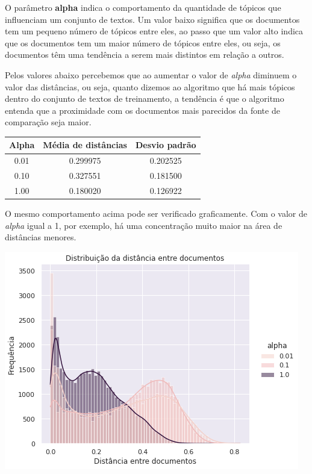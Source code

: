 O parâmetro \textbf{alpha} indica o comportamento da quantidade de tópicos que influenciam um conjunto de textos. Um valor baixo significa 
que os documentos tem um pequeno número de tópicos entre eles, ao passo que um valor alto indica que os documentos tem um maior número
de tópicos entre eles, ou seja, os documentos têm uma tendência a serem mais distintos em relação a outros.

Pelos valores abaixo percebemos que ao aumentar o valor de \textit{alpha} diminuem o valor das distâncias, ou seja, quanto dizemos ao algoritmo
que há mais tópicos dentro do conjunto de textos de treinamento, a tendência é que o algoritmo entenda que a proximidade com os documentos mais parecidos
da fonte de comparação seja maior.

\begin{center}
    \begin{tabular}{|c|c|c|}
        \hline
        Alpha & Média de distâncias & Desvio padrão \\ 
        \hline
        0.01 & 0.299975 & 0.202525 \\ 
        \hline
        0.10 & 0.327551 & 0.181500 \\ 
        \hline
        1.00 & 0.180020 & 0.126922 \\ 
        \hline
    \end{tabular}
\end{center}

O mesmo comportamento acima pode ser verificado graficamente. Com o valor de \textit{alpha} igual a 1, por exemplo, há uma concentração 
muito maior na área de distâncias menores.

\includegraphics[scale=0.7]{resultados/resources/distribuicao_distancias_alpha.png}

